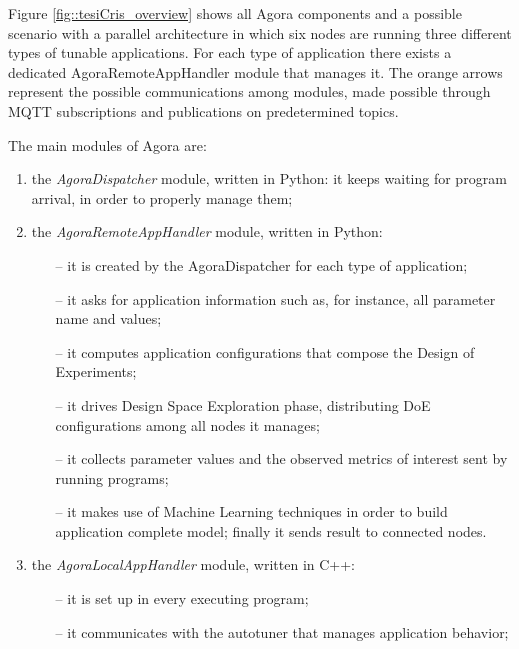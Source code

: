 Figure \ref{fig::tesiCris_overview} shows all Agora components and a possible scenario with a parallel architecture in which six nodes are running three different types of tunable applications. For each type of application there exists a dedicated AgoraRemoteAppHandler module that manages it. The orange arrows represent the possible communications among modules, made possible through MQTT subscriptions and publications on predetermined topics.

The main modules of Agora are:

\begin{enumerate}

    \item the \textit{AgoraDispatcher} module, written in Python: it keeps waiting for program arrival, in order to properly manage them;
    
    \item the \textit{AgoraRemoteAppHandler} module, written in Python:
	\begin{itemize}	
		\item [--] it is created by the AgoraDispatcher for each type of application;

		\item [--] it asks for application information such as, for instance, all parameter name and values;

		\item [--] it computes application configurations that compose the Design of Experiments;

		\item [--] it drives Design Space Exploration phase, distributing DoE configurations among all nodes it manages;

		\item [--] it collects parameter values and the observed metrics of interest sent by running programs;

		\item [--] it makes use of Machine Learning techniques in order to build application complete model; finally it sends result to connected nodes.
	\end{itemize}
    
    \item the \textit{AgoraLocalAppHandler} module, written in C++:
	\begin{itemize}
		\item [--] it is set up in every executing program;

		\item [--] it communicates with the autotuner that manages application behavior;


\end{itemize}
\end{enumerate}
